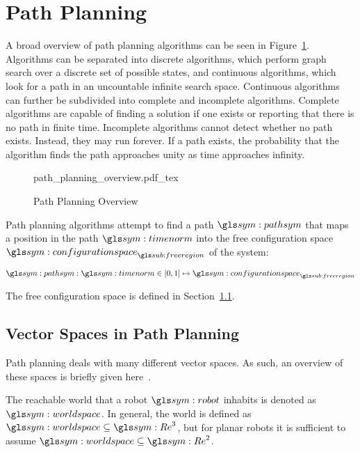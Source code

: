 \section{Path Planning}%
\label{sec:path_planning}

	A broad overview of path planning algorithms can be seen in
	Figure~\ref{fig:path_planning_overview}. Algorithms can be separated into
	discrete algorithms, which perform graph search over a discrete set of
	possible states, and continuous algorithms, which look for a path in an
	uncountable infinite search space. Continuous algorithms can further be
	subdivided into complete and incomplete algorithms. Complete algorithms are
	capable of finding a solution if one exists or reporting that there is no
	path in finite time. Incomplete algorithms cannot detect whether no path
	exists. Instead, they may run forever. If a path exists, the probability
	that the algorithm finds the path approaches unity as time approaches
	infinity.

	\begin{figure}[hb]
		\centering
		\def\svgwidth{\columnwidth}
		{path_planning_overview.pdf_tex}
		\caption{Path Planning Overview}%
		\label{fig:path_planning_overview}
	\end{figure}

	Path planning algorithms attempt to find a path $\pathsym$ that maps a
	position in the path $\timenorm$ into the free configuration space
	$\configurationspace_{\freeregion}$ of the system:

	\begin{equation}
		\pathsym : \timenorm \in [0, 1] \mapsto \configurationspace_{\freeregion}
	\end{equation}

	The free configuration space is defined in
	Section~\ref{sec:vector_spaces_in_path_planning}.


	\subsection{Vector Spaces in Path Planning}%
	\label{sec:vector_spaces_in_path_planning}

		Path planning deals with many different vector spaces. As such, an
		overview of these spaces is briefly given
		here~\cite{bib:planning:planning_algorithms}.

		The reachable world that a robot $\robot$ inhabits is denoted as
		$\world$. In general, the world is defined as $\world \subseteq \Re^3$,
		but for planar robots it is sufficient to assume $\world \subseteq
		\Re^2$.

